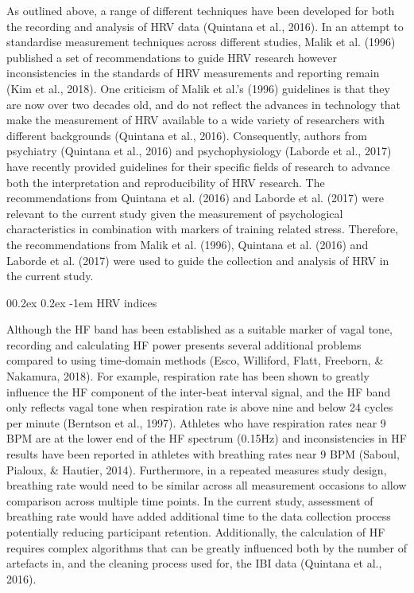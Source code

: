 \documentclass[
  english,
  man,floatsintext]{apa6}
\makeatletter
\renewcommand{\paragraph}{\@startsection{paragraph}{4}{\parindent}%
  {0\baselineskip \@plus 0.2ex \@minus 0.2ex}%
  {-1em}%
  {\normalfont\normalsize\bfseries\itshape\typesectitle}}
\makeatother
\begin{document}
As outlined above, a range of different techniques have been developed for both the recording and analysis of HRV data (Quintana et al., 2016).
In an attempt to standardise measurement techniques across different studies, Malik et al. (1996) published a set of recommendations to guide HRV research however inconsistencies in the standards of HRV measurements and reporting remain (Kim et al., 2018).
One criticism of Malik et al.'s (1996) guidelines is that they are now over two decades old, and do not reflect the advances in technology that make the measurement of HRV available to a wide variety of researchers with different backgrounds (Quintana et al., 2016).
Consequently, authors from psychiatry (Quintana et al., 2016) and psychophysiology (Laborde et al., 2017) have recently provided guidelines for their specific fields of research to advance both the interpretation and reproducibility of HRV research.
The recommendations from Quintana et al. (2016) and Laborde et al. (2017) were relevant to the current study given the measurement of psychological characteristics in combination with markers of training related stress.
Therefore, the recommendations from Malik et al. (1996), Quintana et al. (2016) and Laborde et al. (2017) were used to guide the collection and analysis of HRV in the current study.

\hypertarget{hrv-indices}{%
\paragraph{HRV indices}\label{hrv-indices}}

Although the HF band has been established as a suitable marker of vagal tone, recording and calculating HF power presents several additional problems compared to using time-domain methods (Esco, Williford, Flatt, Freeborn, \& Nakamura, 2018).
For example, respiration rate has been shown to greatly influence the HF component of the inter-beat interval signal, and the HF band only reflects vagal tone when respiration rate is above nine and below 24 cycles per minute (Berntson et al., 1997).
Athletes who have respiration rates near 9 BPM are at the lower end of the HF spectrum (0.15Hz) and inconsistencies in HF results have been reported in athletes with breathing rates near 9 BPM (Saboul, Pialoux, \& Hautier, 2014).
Furthermore, in a repeated measures study design, breathing rate would need to be similar across all measurement occasions to allow comparison across multiple time points.
In the current study, assessment of breathing rate would have added additional time to the data collection process potentially reducing participant retention.
Additionally, the calculation of HF requires complex algorithms that can be greatly influenced both by the number of artefacts in, and the cleaning process used for, the IBI data (Quintana et al., 2016).
\end{document}
